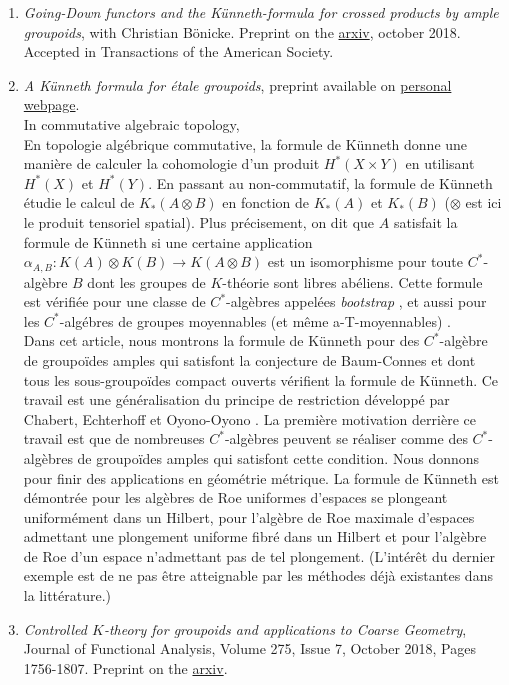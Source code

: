 \documentclass[a4paper]{article}
\begin{document}
\begin{enumerate}
\item \textit{Going-Down functors and the Künneth-formula for crossed products by ample groupoids}, with Christian Bönicke. Preprint on the \href{https://arxiv.org/abs/1810.04415}{arxiv}, october 2018. Accepted in Transactions of the American Society.\\

\item \textit{A K\"{u}nneth formula for \'etale groupoids}, preprint available on \href{http://math.hawaii.edu/~dellaiera/Research.html}{personal webpage}.\\

In commutative algebraic topology,\\

En topologie alg\'ebrique commutative, la formule de K\"unneth donne une mani\`ere de calculer la cohomologie d'un produit $H^*(X\times Y)$ en utilisant $H^*(X)$ et $H^*(Y)$. En passant au non-commutatif, la formule de K\"unneth \'etudie le calcul de $K_*(A \otimes B)$ en fonction de $K_*(A)$ et $K_*(B)$ ($\otimes$ est ici le produit tensoriel spatial). Plus pr\'ecisement, on dit que $A$ satisfait la formule de K\"unneth si une certaine application $\alpha_{A,B}: K(A)\otimes K(B) \rightarrow K(A\otimes B)$ est un isomorphisme pour toute $C^*$-alg\`ebre $B$ dont les groupes de $K$-th\'eorie sont libres ab\'eliens. Cette formule est v\'erifi\'ee pour une classe de $C^*$-alg\`ebres appel\'ees \textit{bootstrap} \cite{rosenberg1987kunneth}, et aussi pour les $C^*$-alg\'ebres de groupes moyennables (et m\^eme a-T-moyennables) \cite{BaumConnesHigson}\cite{TuThese}. \\

Dans cet article, nous montrons la formule de K\"unneth pour des $C^*$-alg\`ebre de groupo\"ides amples qui satisfont la conjecture de Baum-Connes et dont tous les sous-groupo\"ides compact ouverts v\'erifient la formule de K\"unneth. Ce travail est une g\'en\'eralisation du principe de restriction d\'evelopp\'e par Chabert, Echterhoff et Oyono-Oyono \cite{ChabertEOY}. La premi\`ere motivation derri\`ere ce travail est que de nombreuses $C^*$-alg\`ebres peuvent se r\'ealiser comme des $C^*$-alg\`ebres de groupo\"ides amples qui satisfont cette condition. Nous donnons pour finir des applications en g\'eom\'etrie m\'etrique. La formule de K\"unneth est d\'emontr\'ee pour les alg\`ebres de Roe uniformes d'espaces se plongeant uniform\'ement dans un Hilbert, pour l'alg\`ebre de Roe maximale d'espaces admettant une plongement uniforme fibr\'e dans un Hilbert et pour l'alg\`ebre de Roe d'un espace n'admettant pas de tel plongement. (L'int\'er\^et du dernier exemple est de ne pas \^etre atteignable par les m\'ethodes d\'ej\`a existantes dans la litt\'erature.)  

\item \textit{Controlled $K$-theory for groupoids and applications to Coarse Geometry}, Journal of Functional Analysis, Volume 275, Issue 7, October 2018, Pages 1756-1807. Preprint on the \href{https://arxiv.org/abs/1710.06099}{arxiv}. 
\end{enumerate}

\newpage

 
\end{document}
